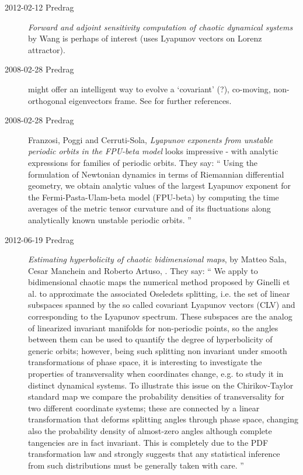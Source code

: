 \begin{description}
\item[2012-02-12 Predrag]
{\em Forward and adjoint sensitivity computation of chaotic dynamical
systems} by Wang is perhaps of interest (uses Lyapunov vectors
on Lorenz attractor).

\item[2008-02-28 Predrag]  might offer an
intelligent way to evolve a `covariant' (?), co-moving, non-orthogonal
{\jacobianM} eigenvectors frame. See  for
further references.

\item[2008-02-28 Predrag]
Franzosi, Poggi and Cerruti-Sola,
{\em Lyapunov exponents from unstable periodic orbits
  in the {FPU}-beta model}
looks impressive -
    with analytic expressions for families of periodic orbits. They say:
    ``
Using the formulation of Newtonian dynamics in terms of Riemannian
differential geometry, we obtain analytic values of the largest
Lyapunov exponent for the Fermi-Pasta-Ulam-beta model (FPU-beta) by
computing the time averages of the metric tensor curvature and of its
fluctuations along analytically known unstable periodic orbits.
    ''

\item[2012-06-19 Predrag]
{\em Estimating hyperbolicity of chaotic bidimensional maps}, by Matteo
Sala, Cesar Manchein and Roberto Artuso, . They say: ``
We apply to bidimensional chaotic maps the numerical method proposed by
Ginelli et al. to approximate the associated Oseledets splitting, i.e.
the set of linear subspaces spanned by the so called covariant Lyapunov
vectors (CLV) and corresponding to the Lyapunov spectrum. These subspaces
are the analog of linearized invariant manifolds for non-periodic points,
so the angles between them can be used to quantify the degree of
hyperbolicity of generic orbits; however, being such splitting non
invariant under smooth transformations of phase space, it is interesting
to investigate the properties of transversality when coordinates change,
e.g. to study it in distinct dynamical systems. To illustrate this issue
on the Chirikov-Taylor standard map we compare the probability densities
of transversality for two different coordinate systems; these are
connected by a linear transformation that deforms splitting angles
through phase space, changing also the probability density of almost-zero
angles although complete tangencies are in fact invariant. This is
completely due to the PDF transformation law and strongly suggests that
any statistical inference from such distributions must be generally taken
with care.
''


\end{description}
